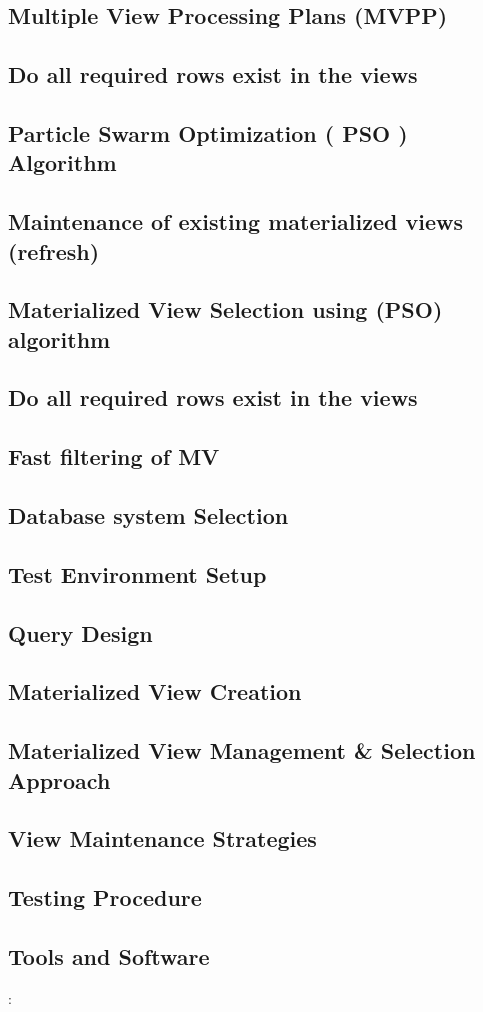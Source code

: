\subsection{Multiple View Processing Plans (MVPP) }
\subsection{Do all required rows exist in the views }
\subsection{Particle Swarm Optimization ( PSO ) Algorithm
 }
\subsection{Maintenance of existing materialized views (refresh)
}
\subsection{Materialized View Selection using (PSO) algorithm }
\subsection{Do all required rows exist in the views }
\subsection{Fast filtering of MV}

\subsection{Database system Selection}
\subsection{Test Environment Setup }
\subsection{Query Design}
\subsection{Materialized View Creation} 
\subsection{Materialized View Management \& Selection Approach}
\subsection{View Maintenance Strategies}
\subsection{Testing Procedure}
\subsection{Tools and Software}: 